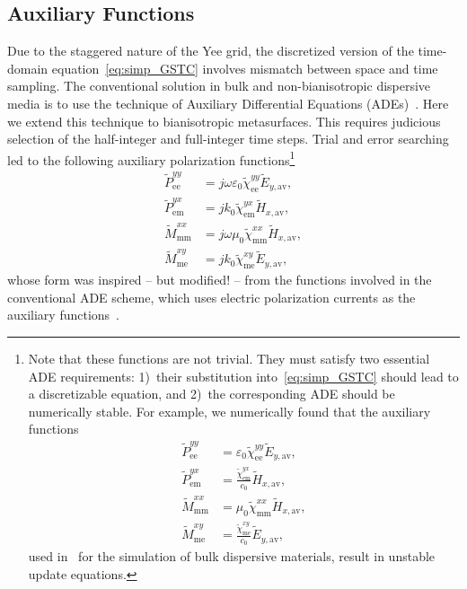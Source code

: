 \documentclass[journal]{IEEEtran}
\begin{document}
\subsection{Auxiliary Functions}
Due to the staggered nature of the Yee grid, the discretized version of the time-domain equation~\eqref{eq:simp_GSTC} involves mismatch between space and time sampling. The conventional solution in bulk and non-bianisotropic dispersive media is to use the technique of Auxiliary Differential Equations (ADEs)~\cite{Susan_FDTD2005}. Here we extend this technique to bianisotropic metasurfaces. This requires judicious selection of the half-integer and full-integer time steps. Trial and error searching led to the following auxiliary polarization functions\footnote{Note that these functions are not trivial. They must satisfy two essential ADE requirements: 1)~their substitution into~\eqref{eq:simp_GSTC} should lead to a discretizable equation, and 2)~the corresponding ADE should be numerically stable. For example, we numerically found that the auxiliary functions
 \begin{subequations}
  \begin{align*}
  \tilde{P}_\textrm{ee}^{yy} & =\varepsilon_0\tilde{\chi}^{yy}_\textrm{ee}\tilde{E}_{y,\textrm{av}}, \\
  \tilde{P}_\textrm{em}^{yx} & =\frac{\tilde{\chi}^{yx}_\textrm{em}}{c_0} \tilde{H}_{x,\textrm{av}}, \\
  \tilde{M}_\textrm{mm}^{xx} & =\mu_0\tilde{\chi}^{xx}_\textrm{mm}\tilde{H}_{x,\textrm{av}}, \\
  \tilde{M}_\textrm{me}^{xy} & =\frac{\tilde{\chi}^{xy}_\textrm{me}}{c_0} \tilde{E}_{y,\textrm{av}},
\end{align*}
\end{subequations}
used in~\cite{Susan_FDTD2005} for the simulation of bulk dispersive materials, result in unstable update equations.}
%
\begin{subequations}\label{eq:PM_Lorentz}
  \begin{align}
  \tilde{P}_\textrm{ee}^{yy} & =j\omega\varepsilon_0\tilde{\chi}^{yy}_\textrm{ee}\tilde{E}_{y,\textrm{av}},\label{eq:PM_Lorentz_1} \\
  \tilde{P}_\textrm{em}^{yx} & =jk_0\tilde{\chi}^{yx}_\textrm{em}\tilde{H}_{x,\textrm{av}},\label{eq:PM_Lorentz_2} \\
  \tilde{M}_\textrm{mm}^{xx} & =j\omega\mu_0\tilde{\chi}^{xx}_\textrm{mm}\tilde{H}_{x,\textrm{av}},\label{eq:PM_Lorentz_3} \\
  \tilde{M}_\textrm{me}^{xy} & =jk_0\tilde{\chi}^{xy}_\textrm{me}\tilde{E}_{y,\textrm{av}},\label{eq:PM_Lorentz_4}
\end{align}
\end{subequations}
whose form was inspired -- but modified! -- from the functions involved in the conventional ADE scheme, which uses electric polarization currents as the auxiliary functions~\cite{Susan_FDTD2005}.
\end{document}
